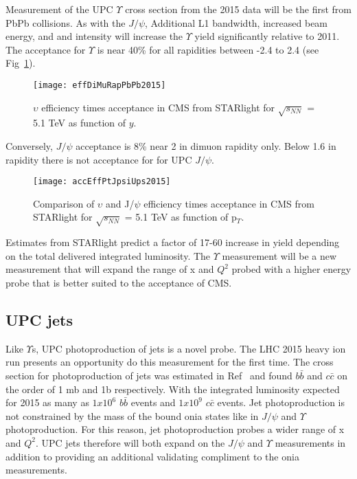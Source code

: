       Measurement of the UPC $\Upsilon$ cross section from the 2015 data will 
        be the first from PbPb collisions. 
      As with the $J/\psi$, Additional L1 bandwidth, increased beam energy, and
        and intensity will increase the $\Upsilon$ yield significantly relative
        to 2011. 
      The acceptance for $\Upsilon$ is near 40\% for all rapidities between 
      -2.4 to 2.4 (see Fig~\ref{fig:accEffUps2015}).
      \begin{figure}[!Hhtb]
        \centering
        \texttt{[image: effDiMuRapPbPb2015]}
        \caption{$\upsilon$ efficiency times acceptance in CMS from STARlight
          for $\sqrt{s_{NN}}$ = 5.1 TeV as function of $y$.}
        \label{fig:accEffUps2015}
      \end{figure}
      Conversely, $J/\psi$ acceptance is 8\% near 2 in dimuon rapidity only. 
      Below 1.6 in rapidity there is not acceptance for for UPC $J/\psi$.
      \begin{figure}[!Hhtb]
        \centering
        \texttt{[image: accEffPtJpsiUps2015]}
        \caption{Comparison of $\upsilon$ and J/$\psi$ efficiency times 
            acceptance in CMS from STARlight
            for $\sqrt{s_{NN}}$ = 5.1 TeV as function of p$_{T}$.}
        \label{fig:accEffPtJpsiUps2015}
      \end{figure}
      Estimates from STARlight predict a factor of 17-60 increase in yield
        depending on the total delivered integrated luminosity. 
      The $\Upsilon$ measurement will be a new measurement that will expand the 
        range of x and $Q^{2}$ probed with a higher energy probe that is better
        suited to the acceptance of CMS.


    \subsection{UPC jets}
      Like $\Upsilon$s, UPC photoproduction of jets is a novel probe.
      The LHC 2015 heavy ion run presents an opportunity do this measurement 
        for the first time. 
      The cross section for photoproduction of jets was estimated in 
      Ref~\cite{upcJets1} and found $b\bar{b}$ and $c\bar{c}$ on the order of 
        1 mb and 1b respectively.
      With the integrated luminosity expected for 2015 as many as $1x10^{6}$
        $b\bar{b}$ events and $1x10^{9}$ $c\bar{c}$ events. 
      Jet photoproduction is not constrained by the mass of the bound onia 
        states like in $J/\psi$ and $\Upsilon$ photoproduction. 
      For this reason, jet photoproduction probes a wider range of x and 
        $Q^{2}$.
      UPC jets therefore will both expand on the $J/\psi$ and $\Upsilon$ 
        measurements in addition to providing an additional validating 
        compliment to the onia measurements.


